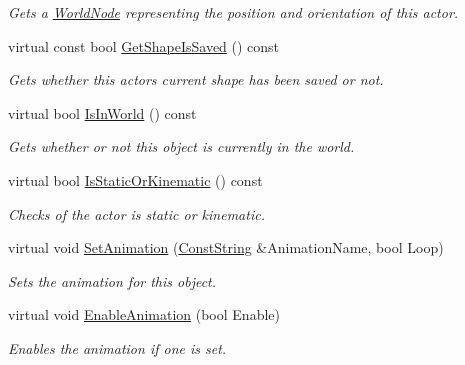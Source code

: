 \begin{DoxyCompactItemize}
\begin{DoxyCompactList}\small\item\em Gets a \hyperlink{classphys_1_1WorldNode}{WorldNode} representing the position and orientation of this actor. \item\end{DoxyCompactList}\item 
virtual const bool \hyperlink{classphys_1_1ActorBase_a7252ef851b23b83b4e402ccb0dee8a32}{GetShapeIsSaved} () const 
\begin{DoxyCompactList}\small\item\em Gets whether this actors current shape has been saved or not. \item\end{DoxyCompactList}\item 
virtual bool \hyperlink{classphys_1_1ActorBase_a8bab6e57c5919042841a2abf6a222613}{IsInWorld} () const 
\begin{DoxyCompactList}\small\item\em Gets whether or not this object is currently in the world. \item\end{DoxyCompactList}\item 
virtual bool \hyperlink{classphys_1_1ActorBase_a3c788bba177b0a31f3701b05718be73c}{IsStaticOrKinematic} () const 
\begin{DoxyCompactList}\small\item\em Checks of the actor is static or kinematic. \item\end{DoxyCompactList}\item 
virtual void \hyperlink{classphys_1_1ActorBase_a1c84866a23fdf7598462839dddae3240}{SetAnimation} (\hyperlink{namespacephys_a5ce5049f8b4bf88d6413c47b504ebb31}{ConstString} \&AnimationName, bool Loop)
\begin{DoxyCompactList}\small\item\em Sets the animation for this object. \item\end{DoxyCompactList}\item 
virtual void \hyperlink{classphys_1_1ActorBase_a72203a9c7befd1ab606ff69af4183849}{EnableAnimation} (bool Enable)
\begin{DoxyCompactList}\small\item\em Enables the animation if one is set. \item\end{DoxyCompactList}\item 

\end{DoxyCompactItemize}
